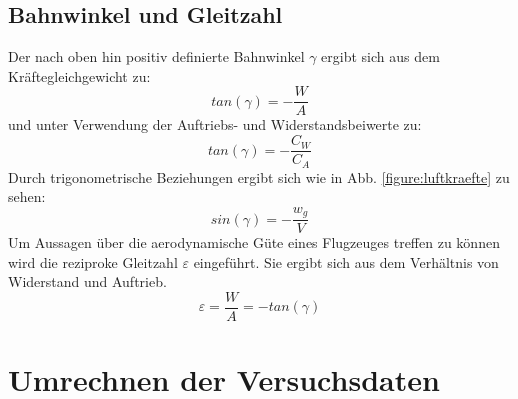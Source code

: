 \subsection{Bahnwinkel und Gleitzahl}
Der nach oben hin positiv definierte Bahnwinkel $\gamma$ ergibt sich aus dem Kräftegleichgewicht zu:
\begin{equation}
tan(\gamma)=-\frac{W}{A}
\end{equation}
und unter Verwendung der Auftriebs- und Widerstandsbeiwerte zu:
\begin{equation}
tan(\gamma)=-\frac{C_W}{C_A}
\end{equation}
Durch trigonometrische Beziehungen ergibt sich wie in Abb. \ref{figure:luftkraefte} zu sehen:
\begin{equation}
\label{eq:bahnneigungswinkel}
sin(\gamma) = -\frac{w_g}{V}
\end{equation}
%
%
%
%
%
%
%
%
%
%
%
%
%
%
%
%
%
%
Um Aussagen über die aerodynamische Güte eines Flugzeuges treffen zu können wird die reziproke Gleitzahl $\varepsilon$ eingeführt. Sie ergibt sich aus dem Verhältnis von Widerstand und Auftrieb.
\begin{equation}
\varepsilon=\frac{W}{A}=-tan(\gamma)
\end{equation}
%

\section{Umrechnen der Versuchsdaten}
